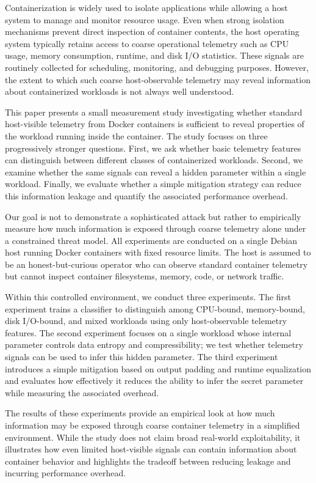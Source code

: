 \documentclass[11pt]{article}
\begin{document}
Containerization is widely used to isolate applications while allowing a host system to manage and monitor resource usage. Even when strong isolation mechanisms prevent direct inspection of container contents, the host operating system typically retains access to coarse operational telemetry such as CPU usage, memory consumption, runtime, and disk I/O statistics. These signals are routinely collected for scheduling, monitoring, and debugging purposes. However, the extent to which such coarse host-observable telemetry may reveal information about containerized workloads is not always well understood.

This paper presents a small measurement study investigating whether standard host-visible telemetry from Docker containers is sufficient to reveal properties of the workload running inside the container. The study focuses on three progressively stronger questions. First, we ask whether basic telemetry features can distinguish between different classes of containerized workloads. Second, we examine whether the same signals can reveal a hidden parameter within a single workload. Finally, we evaluate whether a simple mitigation strategy can reduce this information leakage and quantify the associated performance overhead.

Our goal is not to demonstrate a sophisticated attack but rather to empirically measure how much information is exposed through coarse telemetry alone under a constrained threat model. All experiments are conducted on a single Debian host running Docker containers with fixed resource limits. The host is assumed to be an honest-but-curious operator who can observe standard container telemetry but cannot inspect container filesystems, memory, code, or network traffic.

Within this controlled environment, we conduct three experiments. The first experiment trains a classifier to distinguish among CPU-bound, memory-bound, disk I/O-bound, and mixed workloads using only host-observable telemetry features. The second experiment focuses on a single workload whose internal parameter controls data entropy and compressibility; we test whether telemetry signals can be used to infer this hidden parameter. The third experiment introduces a simple mitigation based on output padding and runtime equalization and evaluates how effectively it reduces the ability to infer the secret parameter while measuring the associated overhead.

The results of these experiments provide an empirical look at how much information may be exposed through coarse container telemetry in a simplified environment. While the study does not claim broad real-world exploitability, it illustrates how even limited host-visible signals can contain information about container behavior and highlights the tradeoff between reducing leakage and incurring performance overhead.
\end{document}
